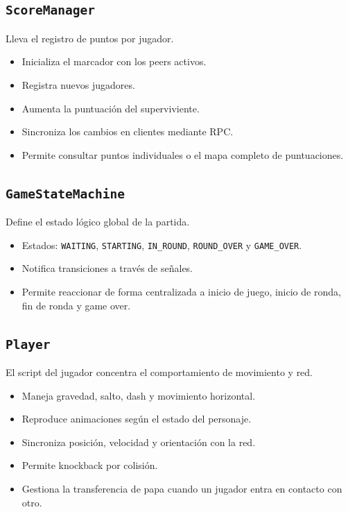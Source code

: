 \documentclass[11pt,a4paper]{article}
\begin{document}
\subsection{\texttt{ScoreManager}}
Lleva el registro de puntos por jugador.
\begin{itemize}[nosep]
    \item Inicializa el marcador con los peers activos.
    \item Registra nuevos jugadores.
    \item Aumenta la puntuación del superviviente.
    \item Sincroniza los cambios en clientes mediante RPC.
    \item Permite consultar puntos individuales o el mapa completo de puntuaciones.
\end{itemize}

\subsection{\texttt{GameStateMachine}}
Define el estado lógico global de la partida.
\begin{itemize}[nosep]
    \item Estados: \texttt{WAITING}, \texttt{STARTING}, \texttt{IN\_ROUND}, \texttt{ROUND\_OVER} y \texttt{GAME\_OVER}.
    \item Notifica transiciones a través de señales.
    \item Permite reaccionar de forma centralizada a inicio de juego, inicio de ronda, fin de ronda y game over.
\end{itemize}

\subsection{\texttt{Player}}
El script del jugador concentra el comportamiento de movimiento y red.
\begin{itemize}[nosep]
    \item Maneja gravedad, salto, dash y movimiento horizontal.
    \item Reproduce animaciones según el estado del personaje.
    \item Sincroniza posición, velocidad y orientación con la red.
    \item Permite knockback por colisión.
    \item Gestiona la transferencia de papa cuando un jugador entra en contacto con otro.
\end{itemize}
\end{document}

